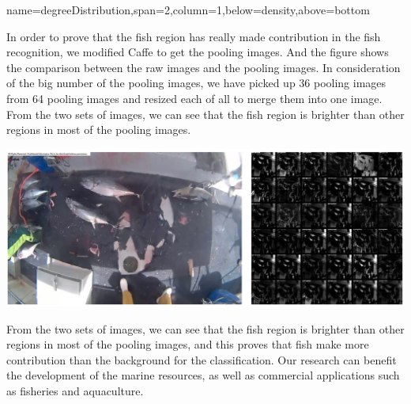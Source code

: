 \documentclass[a0paper,portrait]{baposter}
\begin{document}
\begin{poster}
{name=degreeDistribution,span=2,column=1,below=density,above=bottom}{
\quad In order to prove that the fish region has really made contribution in the fish recognition, we modified Caffe\cite{gulya-kampis1} to get the pooling images. And the figure shows the comparison between the raw images and the pooling images. In consideration of the big number of the pooling images, we have picked up 36 pooling images from 64 pooling images and resized each of all to merge them into one image. From the two sets of images, we can see that the fish region is brighter than other regions in most of the pooling images.

\vspace{-0.2em}
\begin{center}
	\includegraphics[width=\linewidth]{merge}
\end{center}
\vspace{-0.2em}
\quad From the two sets of images, we can see that the fish region is brighter than other regions in most of the pooling images, and this proves that fish make more contribution than the background for the classification. Our research can benefit the development of the marine resources, as well as commercial applications such as fisheries and aquaculture.
}

\end{poster}
\end{document}
